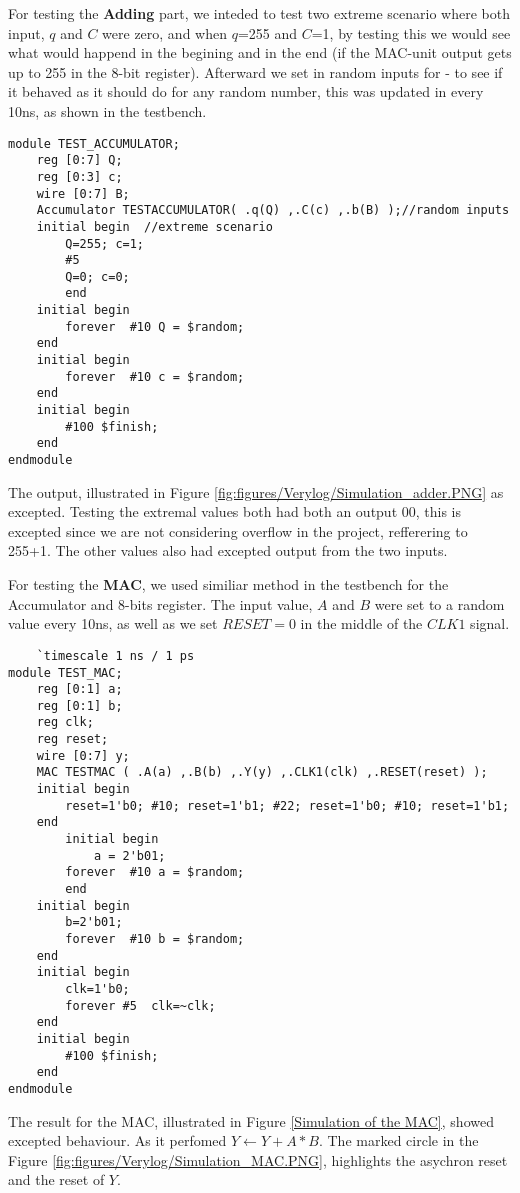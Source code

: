 For testing the \textbf{Adding} part, we inteded to test two extreme scenario where both input, $q$ and $C$ were zero, and when $q$=255 and $C$=1, by testing this we would see what would happend in the begining and in the end (if the MAC-unit output gets up to 255 in the 8-bit register). Afterward we set in random inputs for - to see if it behaved as it should do for any random number, this was updated in every 10ns, as shown in the testbench.

\begin{lstlisting}
module TEST_ACCUMULATOR;
	reg [0:7] Q;
	reg [0:3] c;
	wire [0:7] B;  
	Accumulator TESTACCUMULATOR( .q(Q) ,.C(c) ,.b(B) );//random inputs	  
	initial begin  //extreme scenario
		Q=255; c=1;
		#5
		Q=0; c=0;
		end
	initial begin 
  		forever	 #10 Q = $random;
	end	  
	initial begin
  		forever	 #10 c = $random;
	end	
	initial begin
		#100 $finish;
	end	  
endmodule	
\end{lstlisting}
The output, illustrated in Figure \ref{fig:figures/Verylog/Simulation_adder.PNG} as excepted. Testing the extremal values both had both an output 00, this is excepted since we are not considering overflow in the project, refferering to 255+1. The other values also had excepted output from the two inputs. 


For testing the \textbf{MAC}, we used similiar method in the testbench for the Accumulator and 8-bits register. The input value, $A$ and $B$ were set to a random value every 10ns, as well as we set $RESET=0$ in the middle of the $CLK1$ signal.
\begin{lstlisting}
    `timescale 1 ns / 1 ps
module TEST_MAC;
	reg [0:1] a;
	reg [0:1] b;
	reg clk;
	reg reset;
	wire [0:7] y;
	MAC TESTMAC ( .A(a) ,.B(b) ,.Y(y) ,.CLK1(clk) ,.RESET(reset) );	
	initial begin
		reset=1'b0; #10; reset=1'b1; #22; reset=1'b0; #10; reset=1'b1;	
	end
		initial begin
			a = 2'b01;
  		forever	 #10 a = $random;
        end	  
	initial begin
		b=2'b01;
  		forever	 #10 b = $random;
	end	
	initial begin
		clk=1'b0;
		forever #5	clk=~clk;
	end	
	initial begin
		#100 $finish;
	end	
endmodule	
\end{lstlisting}
The result for the MAC, illustrated in Figure \ref{Simulation of the MAC}, showed excepted behaviour. As it perfomed $Y$$\leftarrow$$ Y+ A*B $. The marked circle in the Figure \ref{fig:figures/Verylog/Simulation_MAC.PNG}, highlights the asychron reset and the reset of $Y$.


